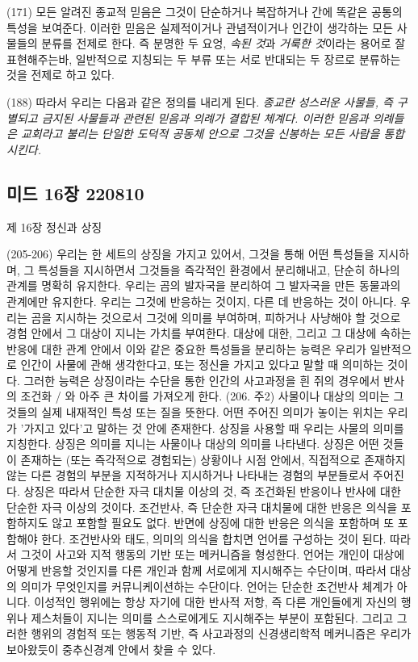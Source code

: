 \documentclass[11pt, a4paper]{article}
\begin{document}
(171) 모든 알려진 종교적 믿음은 그것이 단순하거나 복잡하거나 간에 똑같은 공통의 특성을 보여준다. 이러한 믿음은 실제적이거나 관념적이거나 인간이 생각하는 모든 사물들의 분류를 전제로 한다. 즉 분명한 두 요엉, \emph{속된 것}과 \emph{거룩한 것}이라는 용어로 잘 표현해주는바, 일반적으로 지칭되는 두 부류 또는 서로 반대되는 두 장르로 분류하는 것을 전제로 하고 있다.

(188) 따라서 우리는 다음과 같은 정의를 내리게 된다. \emph{종교란 성스러운 사물들, 즉 구별되고 금지된 사물들과 관련된 믿음과 의례가 결합된 체계다. 이러한 믿음과 의례들은 교회라고 불리는 단일한 도덕적 공동체 안으로 그것을 신봉하는 모든 사람을 통합시킨다.}
\newpage
\subsection{미드 16장 220810}
제 16장 정신과 상징

(205-206) 우리는 한 세트의 상징을 가지고 있어서, 그것을 통해 어떤 특성들을 지시하며, 그 특성들을 지시하면서 그것들을 즉각적인 환경에서 분리해내고, 단순히 하나의 관계를 명확히 유지한다. 우리는 곰의 발자국을 분리하여 그 발자국을 만든 동물과의 관계에만 유지한다. 우리는 그것에 반응하는 것이지, 다른 데 반응하는 것이 아니다. 우리는 곰을 지시하는 것으로서 그것에 의미를 부여하며, 피하거나 사냥해야 할 것으로 경험 안에서 그 대상이 지니는 가치를 부여한다. 대상에 대한, 그리고 그 대상에 속하는 반응에 대한 관계 안에서 이와 같은 중요한 특성들을 분리하는 능력은 우리가 일반적으로 인간이 사물에 관해 생각한다고, 또는 정신을 가지고 있다고 말할 때 의미하는 것이다. 그러한 능력은 상징이라는 수단을 통한 인간의 사고과정을 흰 쥐의 경우에서 반사의 조건화 / 와 아주 큰 차이를 가져오게 한다.
(206. 주2) 사물이나 대상의 의미는 그것들의 실제 내재적인 특성 또는 질을 뜻한다. 어떤 주어진 의미가 놓이는 위치는 우리가 '가지고 있다'고 말하는 것 안에 존재한다. 상징을 사용할 때 우리는 사물의 의미를 지칭한다. 상징은 의미를 지니는 사물이나 대상의 의미를 나타낸다. 상징은 어떤 것들이 존재하는 (또는 즉각적으로 경험되는) 상황이나 시점 안에서, 직접적으로 존재하지 않는 다른 경험의 부분을 지적하거나 지시하거나 나타내는 경험의 부분들로서 주어진다. 상징은 따라서 단순한 자극 대치물 이상의 것, 즉 조건화된 반응이나 반사에 대한 단순한 자극 이상의 것이다. 조건반사, 즉 단순한 자극 대치물에 대한 반응은 의식을 포함하지도 않고 포함할 필요도 없다. 반면에 상징에 대한 반응은 의식을 포함하며 또 포함해야 한다. 조건반사와 태도, 의미의 의식을 합치면 언어를 구성하는 것이 된다. 따라서 그것이 사고와 지적 행동의 기반 또는 메커니즘을 형성한다. 언어는 개인이 대상에 어떻게 반응할 것인지를 다른 개인과 함께 서로에게 지시해주는 수단이며, 따라서 대상의 의미가 무엇인지를 커뮤니케이션하는 수단이다. 언어는 단순한 조건반사 체계가 아니다. 이성적인 행위에는 항상 자기에 대한 반사적 저항, 즉 다른 개인들에게 자신의 행위나 제스처들이 지니는 의미를 스스로에게도 지시해주는 부분이 포함된다. 그리고 그러한 행위의 경험적 또는 행동적 기반, 즉 사고과정의 신경생리학적 메커니즘은 우리가 보아왔듯이 중추신경계 안에서 찾을 수 있다.
\end{document}
